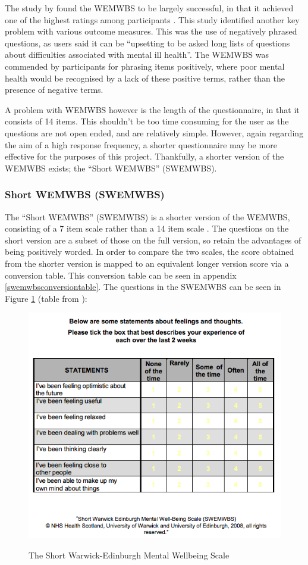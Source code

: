 \documentclass[11pt,openright,a4paper]{report}
\begin{document}
The study by \citeauthor{crawford2011selecting} found the WEMWBS to be largely successful, in that it achieved one of the highest ratings among participants \parencite{crawford2011selecting}. This study identified another key problem with various outcome measures. This was the use of negatively phrased questions, as users said it can be \enquote{upsetting to be asked long lists of questions about difficulties associated with mental ill
health}. The WEMWBS was commended by participants for phrasing items positively, where poor mental health would be recognised by a lack of these positive terms, rather than the presence of negative terms.

A problem with WEMWBS however is the length of the questionnaire, in that it consists of 14 items. This shouldn't be too time consuming for the user as the questions are not open ended, and are relatively simple. However, again regarding the aim of a high response frequency, a shorter questionnaire may be more effective for the purposes of this project. Thankfully, a shorter version of the WEMWBS exists; the \enquote{Short WEMWBS} (SWEMWBS).

\subsubsection{Short WEMWBS (SWEMWBS)} \label{swemwbssection}
The \enquote{Short WEMWBS} (SWEMWBS) is a shorter version of the WEMWBS, consisting of a 7 item scale rather than a 14 item scale \parencite{swemwbs}. The questions on the short version are a subset of those on the full version, so retain the advantages of being positively worded. In order to compare the two scales, the score obtained from the shorter version is mapped to an equivalent longer version score via a conversion table. This conversion table can be seen in appendix \ref{swemwbsconversiontable}.
\newpage
The questions in the SWEMWBS can be seen in Figure \ref{fig:swemwbs} (table from \parencite{swemwbsquestions}):
\begin{figure}[ht]
\centering
\caption{The Short Warwick-Edinburgh Mental Wellbeing Scale}
\includegraphics[width=.8\textwidth]{i/swemwbs.png}
\label{fig:swemwbs}
\end{figure}
\end{document}
